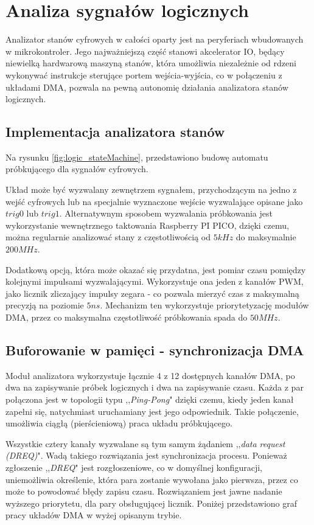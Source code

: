 \section{Analiza sygnałów logicznych}
    Analizator stanów cyfrowych w całości oparty jest na peryferiach wbudowanych w mikrokontroler.
    Jego najważniejszą część stanowi akcelerator IO, będący niewielką hardwarową maszyną stanów, 
    która umożliwia niezależnie od rdzeni wykonywać instrukcje sterujące portem wejścia-wyjścia,
    co w połączeniu z układami DMA, pozwala na pewną autonomię działania analizatora stanów logicznych.


\subsection{Implementacja analizatora stanów}
    Na rysunku \ref{fig:logic_stateMachine}, przedstawiono budowę automatu próbkującego dla sygnałów cyfrowych.

    

    Układ może być wyzwalany zewnętrzem sygnałem, przychodzącym na jedno z wejść cyfrowych lub na specjalnie wyznaczone wejście wyzwalające opisane jako $trig0$ lub $trig 1$.
    Alternatywnym sposobem wyzwalania próbkowania jest wykorzystanie wewnętrznego taktowania Raspberry PI PICO, dzięki czemu, można regularnie analizować stany z częstotliwością od $5kHz$ do maksymalnie $200MHz$.

    Dodatkową opcją, która może okazać się przydatna, jest pomiar czasu pomiędzy kolejnymi impulsami wyzwalającymi.
    Wykorzystuje ona jeden z kanałów PWM, jako licznik zliczający impulsy zegara - co pozwala mierzyć czas z maksymalną precyzją na poziomie $5ns$.
    Mechanizm ten wykorzystuje priorytetyzację modułów DMA, przez co maksymalna częstotliwość próbkowania spada do $50MHz$.


\subsection{Buforowanie w pamięci - synchronizacja DMA}
    Moduł analizatora wykorzystuje łącznie 4 z 12 dostępnych kanałów DMA, po dwa na zapisywanie próbek logicznych i dwa na zapisywanie czasu.
    Każda z par połączona jest w topologii typu ,,\textit{Ping-Pong}" dzięki czemu, kiedy jeden kanał zapełni się, natychmiast uruchamiany jest jego odpowiednik.
    Takie połączenie, umożliwia ciągłą (pierścieniową) praca układu próbkującego.

    Wszystkie cztery kanały wyzwalane są tym samym żądaniem ,,\textit{data request (DREQ)}".
    Wadą takiego rozwiązania jest synchronizacja procesu.
    Ponieważ zgłoszenie ,,\textit{DREQ}" jest rozgłoszeniowe, co w domyślnej konfiguracji, uniemożliwia określenie, która para zostanie wywołana jako pierwsza, przez co  może to powodować błędy zapisu czasu.
    Rozwiązaniem jest jawne nadanie wyższego priorytetu, dla pary obsługującej licznik.
    Poniżej przedstawiono graf pracy układów DMA w wyżej opisanym trybie.
    
    




